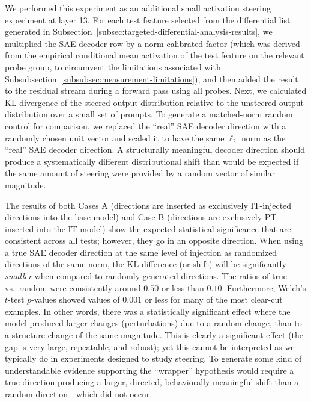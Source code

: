 We performed this experiment as an additional small activation steering experiment at layer 13. For each test feature selected from the differential list generated in Subsection~\ref{subsec:targeted-differential-analysis-results}, we multiplied the SAE decoder row by a norm-calibrated factor (which was derived from the empirical conditional mean activation of the test feature on the relevant probe group, to circumvent the limitations associated with Subsubsection~\ref{subsubsec:measurement-limitations}), and then added the result to the residual stream during a forward pass using all probes. Next, we calculated KL divergence of the steered output distribution relative to the unsteered output distribution over a small set of prompts. To generate a matched-norm random control for comparison, we replaced the ``real'' SAE decoder direction with a randomly chosen unit vector and scaled it to have the same $\ell_2$ norm as the ``real'' SAE decoder direction. A structurally meaningful decoder direction should produce a systematically different distributional shift than would be expected if the same amount of steering were provided by a random vector of similar magnitude.

The results of both Cases A (directions are inserted as exclusively IT-injected directions into the base model) and Case B (directions are exclusively PT-inserted into the IT-model) show the expected statistical significance that are consistent across all tests; however, they go in an opposite direction. When using a true SAE decoder direction at the same level of injection as randomized directions of the same norm, the KL difference (or shift) will be significantly \textit{smaller} when compared to randomly generated directions. The ratios of true vs.\ random were consistently around $0.50$ or less than $0.10$. Furthermore, Welch's $t$-test $p$-values showed values of $0.001$ or less for many of the most clear-cut examples. In other words, there was a statistically significant effect where the model produced larger changes (perturbations) due to a random change, than to a structure change of the same magnitude. This is clearly a significant effect (the gap is very large, repeatable, and robust); yet this cannot be interpreted as we typically do in experiments designed to study steering. To generate some kind of understandable evidence supporting the ``wrapper'' hypothesis would require a true direction producing a larger, directed, behaviorally meaningful shift than a random direction---which did not occur.

